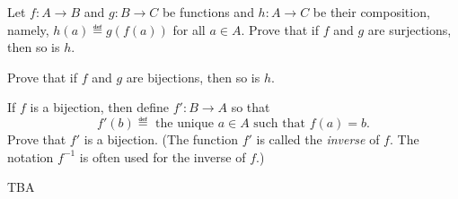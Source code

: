 
\begin{pcomments}
\end{pcomments}



\begin{problem}
  Let $f:A \to B$ and $g: B \to C$ be functions and $h:A \to C$ be their
  composition, namely, $h(a) \eqdef g(f(a))$ for all $a \in A$.
\bparts
  \ppart Prove that if $f$ and $g$ are surjections, then so is $h$.

  \ppart Prove that if $f$ and $g$ are bijections, then so is $h$.

  \ppart If $f$ is a bijection, then define $f':B \to A$ so that
  \[
  f'(b) \eqdef\text{ the unique } a \in A \text{ such that } f(a)=b.
  \]
  Prove that $f'$ is a bijection.  (The function $f'$ is called the
  \emph{inverse} of $f$.  The notation $f^{-1}$ is often used for the
  inverse of $f$.)
\eparts

\begin{solution}
TBA
\end{solution}

\end{problem}


\endinput
